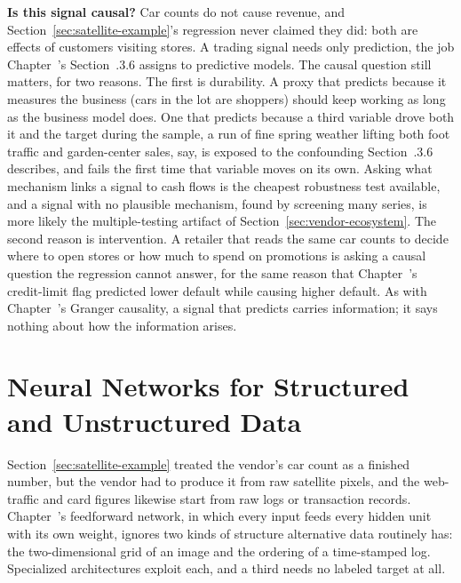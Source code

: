 \documentclass[../ai_in_finance]{subfiles}
\begin{document}
\textbf{Is this signal causal?} Car counts do not cause revenue, and Section~\ref{sec:satellite-example}'s regression never claimed they did: both are effects of customers visiting stores. A trading signal needs only prediction, the job Chapter~'s Section~.3.6 assigns to predictive models. The causal question still matters, for two reasons. The first is durability. A proxy that predicts because it measures the business (cars in the lot are shoppers) should keep working as long as the business model does. One that predicts because a third variable drove both it and the target during the sample, a run of fine spring weather lifting both foot traffic and garden-center sales, say, is exposed to the confounding Section~.3.6 describes, and fails the first time that variable moves on its own. Asking what mechanism links a signal to cash flows is the cheapest robustness test available, and a signal with no plausible mechanism, found by screening many series, is more likely the multiple-testing artifact of Section~\ref{sec:vendor-ecosystem}. The second reason is intervention. A retailer that reads the same car counts to decide where to open stores or how much to spend on promotions is asking a causal question the regression cannot answer, for the same reason that Chapter~'s credit-limit flag predicted lower default while causing higher default. As with Chapter~'s Granger causality, a signal that predicts carries information; it says nothing about how the information arises.

\section{Neural Networks for Structured and Unstructured Data}
\label{sec:nn-structured-unstructured}

Section~\ref{sec:satellite-example} treated the vendor's car count as a finished number, but the vendor had to produce it from raw satellite pixels, and the web-traffic and card figures likewise start from raw logs or transaction records. Chapter~'s feedforward network, in which every input feeds every hidden unit with its own weight, ignores two kinds of structure alternative data routinely has: the two-dimensional grid of an image and the ordering of a time-stamped log. Specialized architectures exploit each, and a third needs no labeled target at all.
\end{document}
